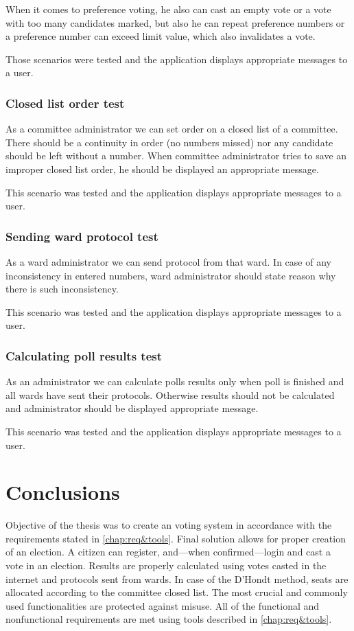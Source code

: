 \documentclass[a4paper,twoside,12pt]{book}
\begin{document}
      When it comes to preference voting, he also can cast an empty vote or a vote with too many candidates marked, but also he can repeat preference numbers or a
      preference number can exceed limit value, which also invalidates a vote.

      Those scenarios were tested and the application displays appropriate messages to a user.

    \subsection{Closed list order test}
      As a committee administrator we can set order on a closed list of a committee.
      There should be a continuity in order (no numbers missed) nor any candidate should be left without a number.
      When committee administrator tries to save an improper closed list order, he should be displayed an appropriate message.

      This scenario was tested and the application displays appropriate messages to a user.

    \subsection{Sending ward protocol test}
      As a ward administrator we can send protocol from that ward.
      In case of any inconsistency in entered numbers, ward administrator should state reason why there is such inconsistency.

      This scenario was tested and the application displays appropriate messages to a user.

    \subsection{Calculating poll results test}
      As an administrator we can calculate polls results only when poll is finished and all wards have sent their protocols.
      Otherwise results should not be calculated and administrator should be displayed appropriate message.
      
      This scenario was tested and the application displays appropriate messages to a user.

\chapter{Conclusions}
  Objective of the thesis was to create an voting system in accordance with the requirements stated in \autoref{chap:req&tools}.
  Final solution allows for proper creation of an election. A citizen can register, and---when confirmed---login and cast a vote in an election.
  Results are properly calculated using votes casted in the internet and protocols sent from wards.
  In case of the D'Hondt method, seats are allocated according to the committee closed list.
  The most crucial and commonly used functionalities are protected against misuse.
  All of the functional and nonfunctional requirements are met using tools described in \autoref{chap:req&tools}.
\end{document}
